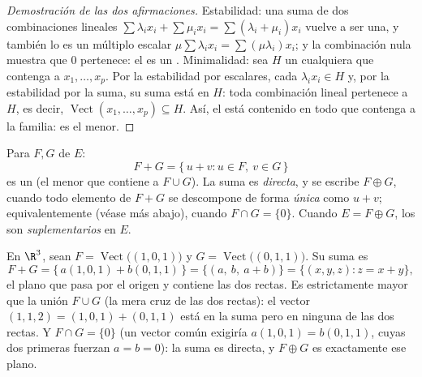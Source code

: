 \begin{proof}[Demostración de las dos afirmaciones]
Estabilidad: una suma de dos combinaciones lineales
$\sum\lambda_i x_i + \sum\mu_i x_i = \sum(\lambda_i + \mu_i)x_i$
vuelve a ser una, y también lo es un múltiplo escalar
$\mu\sum\lambda_i x_i = \sum(\mu\lambda_i) x_i$; y la combinación
nula muestra que $0$ pertenece: el  es un
. Minimalidad: sea $H$ un  cualquiera que
contenga a $x_1, \dots, x_p$. Por la estabilidad por escalares, cada
$\lambda_i x_i \in H$ y, por la estabilidad por la suma, su suma está
en $H$: toda combinación lineal pertenece a $H$, es decir,
$\operatorname{Vect}(x_1, \dots, x_p) \subseteq H$. Así, el
 está contenido en todo  que
contenga a la familia: es el menor.
\end{proof}

\begin{definition}\label{def:b1:vspaces:sum}
Para  $F, G$ de $E$:
\[
F + G = \{\,u + v : u \in F,\ v \in G\,\}
\]
es un  (el menor que contiene a $F \cup G$). La suma es
\emph{directa}, y se escribe $F \oplus G$, cuando
todo elemento de $F + G$ se descompone de forma \emph{única} como
$u + v$; equivalentemente (véase más abajo), cuando
$F \cap G = \{0\}$. Cuando $E = F \oplus G$, los  son
\emph{suplementarios} en $E$.
\end{definition}

\begin{example}
\label{ex:b1:vspaces:sumoflines}
En $\R^3$, sean $F = \operatorname{Vect}\bigl((1,0,1)\bigr)$ y
$G = \operatorname{Vect}\bigl((0,1,1)\bigr)$. Su suma es
\[
F + G = \{\,a(1,0,1) + b(0,1,1)\,\}
= \{(a,\ b,\ a + b)\} = \{(x, y, z) : z = x + y\},
\]
el plano que pasa por el origen y contiene las dos rectas. Es
estrictamente mayor que la unión $F \cup G$ (la mera cruz de las dos
rectas): el vector $(1, 1, 2) = (1,0,1) + (0,1,1)$ está en la suma
pero en ninguna de las dos rectas. Y $F \cap G = \{0\}$ (un vector
común exigiría $a(1,0,1) = b(0,1,1)$, cuyas dos primeras
 fuerzan $a = b = 0$): la suma es directa, y
$F \oplus G$ es exactamente ese plano.
\end{example}

